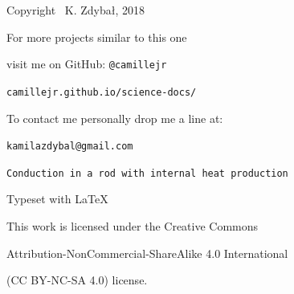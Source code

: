 \documentclass[10pt]{article}
\begin{document}
\begin{center}
\vspace*{6cm}



Copyright \textcopyright \, K. Zdybał, 2018

For more projects similar to this one

visit me on GitHub: \verb|@camillejr|

\verb|camillejr.github.io/science-docs/|

To contact me personally drop me a line at:

\verb|kamilazdybal@gmail.com|

\vspace*{2cm}

\verb|Conduction in a rod with internal heat production|

Typeset with \LaTeX

\vspace*{1.8cm}

\noindent This work is licensed under the Creative Commons

Attribution-NonCommercial-ShareAlike 4.0 International 

(CC BY-NC-SA
4.0) license.
\end{center}
\end{document}
